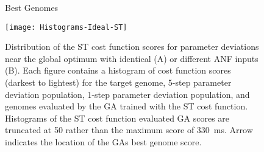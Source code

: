 \begin{figure}[thb!]
 \caption{Best Genomes}
     \label{fig:GA:8}
 \end{figure}

  \begin{figure}[htb]
    \centering
    \texttt{[image: Histograms-Ideal-ST]}
    \caption{Distribution of the ST cost function scores for parameter
      deviations near the global optimum with identical (A) or
      different {ANF} inputs (B). Each figure contains a histogram of
      cost function scores (darkest to lightest) for the target
      genome, 5-step parameter deviation population, 1-step parameter
      deviation population, and genomes evaluated by the {GA} trained
      with the ST cost function.  Histograms of the ST cost function
      evaluated {GA} scores are truncated at 50 rather than the maximum
      score of 330~ms.  Arrow indicates the location of the {GA}s best
      genome score.}
    \label{fig:GA:9}
  \end{figure}



